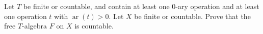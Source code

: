 Let $T$ be finite or countable, and contain at least one $0$-ary operation and at least one operation $t$ with $\operatorname{ar}(t) > 0$. Let $X$ be finite or countable. Prove that the free $T$-algebra $F$ on $X$ is countable.
